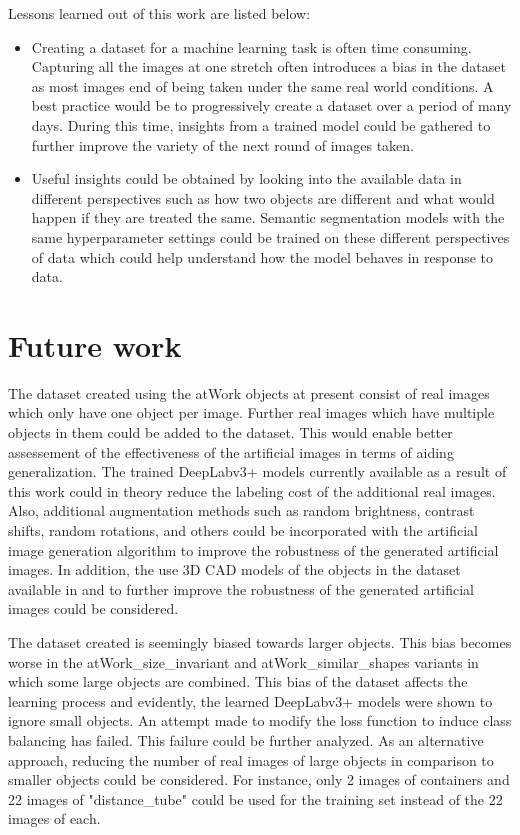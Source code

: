 Lessons learned out of this work are listed below:
	\begin{itemize}
		\item Creating a dataset for a machine learning task is often time consuming. Capturing all the images at one stretch often introduces a bias in the dataset as most images end of being taken under the same real world conditions. A best practice would be to progressively create a dataset over a period of many days. During this time, insights from a trained model could be gathered to further improve the variety of the next round of images taken.
		\item Useful insights could be obtained by looking into the available data in different perspectives such as how two objects are different and what would happen if they are treated the same. Semantic segmentation models with the same hyperparameter settings could be trained on these different perspectives of data which could help understand how the model behaves in response to data.
	\end{itemize}

\section{Future work}

The dataset created using the atWork objects at present consist of real images which only have one object per image. Further real images which have multiple objects in them could be added to the dataset. This would enable better assessement of the effectiveness of the artificial images in terms of aiding generalization. The trained DeepLabv3+ models currently available as a result of this work could in theory reduce the labeling cost of the additional real images. Also, additional augmentation methods such as random brightness, contrast shifts, random rotations, and others could be incorporated with the artificial image generation algorithm to improve the robustness of the generated artificial images. In addition, the use 3D CAD models of the objects in the dataset available in \cite{atwork_models} and \cite{atwork_models_rockin} to further improve the robustness of the generated artificial images could be considered.

The dataset created is seemingly biased towards larger objects. This bias becomes worse in the atWork\_size\_invariant and atWork\_similar\_shapes variants in which some large objects are combined. This bias of the dataset affects the learning process and evidently, the learned DeepLabv3+ models were shown to ignore small objects. An attempt made to modify the loss function to induce class balancing has failed. This failure could be further analyzed. As an alternative approach, reducing the number of real images of large objects in comparison to smaller objects could be considered. For instance, only 2 images of containers and 22 images of "distance\_tube" could be used for the training set instead of the 22 images of each.

